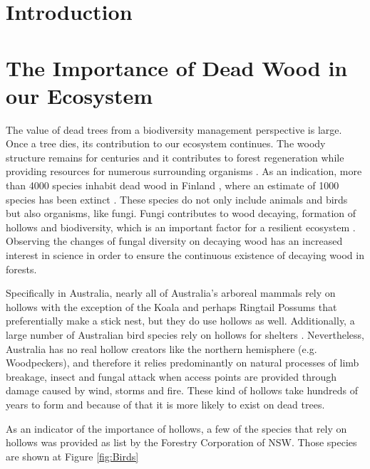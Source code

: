 \documentclass{subfiles}
\begin{document}
\section{Introduction}



\section{The Importance of Dead Wood in our Ecosystem}

\par The value of dead trees from a biodiversity management perspective is large. Once a tree dies, its contribution to our ecosystem continues. The woody structure remains for centuries and it contributes to forest regeneration while providing resources for numerous surrounding organisms \cite{Franklin1987}. As an indication, more than 4000 species inhabit dead wood in Finland \cite{Siitonen2001}, where an estimate of 1000 species has been extinct \cite{Hanski2000}. These species do not only include animals and birds but also organisms, like fungi. Fungi contributes to wood decaying, formation of hollows and biodiversity, which is an important factor for a resilient ecosystem \cite{Peterson2000}. Observing the changes of fungal diversity on decaying wood has an increased interest in science  \cite{Abrego2011} \cite{Stokland2011} \cite{Lonsdale2008} in order to ensure the continuous existence of decaying wood in forests. 




\par Specifically in Australia, nearly all of Australia’s arboreal mammals rely on hollows with the exception of the Koala and perhaps Ringtail Possums that preferentially make a stick nest, but they do use hollows as well. Additionally, a large number of Australian bird species rely on hollows for shelters \cite{Gibbons2002}. Nevertheless, Australia has no real hollow creators like the northern hemisphere (e.g. Woodpeckers), and therefore it relies predominantly on natural processes of limb breakage, insect and fungal attack when access points are provided through damage caused by wind, storms and fire. These kind of hollows take hundreds of years to form and because of that it is more likely to exist on dead trees.  


\par As an indicator of the importance of hollows, a few of the species that rely on hollows was provided as list by the Forestry Corporation of NSW. Those species are shown at Figure \ref{fig:Birds}
\end{document}
